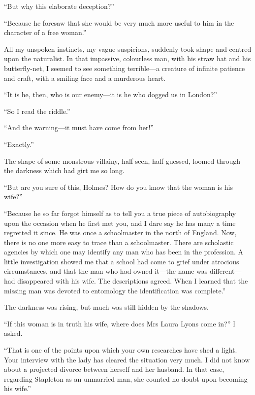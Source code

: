 \documentclass[paper=5.5in:8.5in,BCOR=7mm,twoside,DIV=calc,12pt,usegeometry,openany,chapterprefix,endperiod]{scrbook} %
\begin{document}
\enquote{But why this elaborate deception?}

\enquote{Because he foresaw that she would be very much more useful to him in the character of a free woman.}

All my unspoken instincts, my vague suspicions, suddenly took shape and centred upon the naturalist. In that impassive, colourless man, with his straw hat and his butterfly-net, I seemed to see something terrible\nobreakdash---a creature of infinite patience and craft, with a smiling face and a murderous heart.

\enquote{It is he, then, who is our enemy\nobreakdash---it is he who dogged us in London?}

\enquote{So I read the riddle.}

\enquote{And the warning\nobreakdash---it must have come from her!}

\enquote{Exactly.}

The shape of some monstrous villainy, half seen, half guessed, loomed through the darkness which had girt me so long.

\enquote{But are you sure of this, Holmes? How do you know that the woman is his wife?}

\enquote{Because he so far forgot himself as to tell you a true piece of autobiography upon the occasion when he first met you, and I dare say he has many a time regretted it since. He was once a schoolmaster in the north of England. Now, there is no one more easy to trace than a schoolmaster. There are scholastic agencies by which one may identify any man who has been in the profession. A little investigation showed me that a school had come to grief under atrocious circumstances, and that the man who had owned it\nobreakdash---the name was different\nobreakdash---had disappeared with his wife. The descriptions agreed. When I learned that the missing man was devoted to entomology the identification was complete.}

The darkness was rising, but much was still hidden by the shadows.

\enquote{If this woman is in truth his wife, where does Mrs Laura Lyons come in?} I asked.

\enquote{That is one of the points upon which your own researches have shed a light. Your interview with the lady has cleared the situation very much. I did not know about a projected divorce between herself and her husband. In that case, regarding Stapleton as an unmarried man, she counted no doubt upon becoming his wife.}
\end{document}
